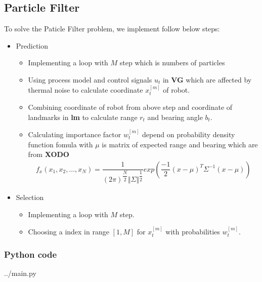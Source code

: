 \documentclass{article}
\begin{document}
\subsection{Particle Filter}
To solve the Paticle Filter problem, we implement follow below steps: \\
\begin{itemize}
	\item{Prediction} 
	\begin{itemize}
		\item{Implementing a loop with $M$ step which is numbers of particles}
		\item{Using process model and control signals $u_t$ in \textbf{VG} which are affected by thermal noise to calculate coordinate $x^{[m]}_t$ of robot.}
		\item{Combining coordinate of robot from above step and coordinate of landmarks in \textbf{lm} to calculate range $r_t$ and bearing angle $b_t$.}
		\item{Calculating importance factor $w^{[m]}_t$ depend on probability density function fomula with $\mu$ is matrix of expected range and bearing which are from \textbf{XODO}}
		\begin{align}
			f_x(x_1,x_2,...,x_N) = \dfrac{1}{\left(2\pi\right)^{\dfrac{N}{2}}\Vert\Sigma\Vert^{\dfrac{1}{2}}}exp\left(\dfrac{-1}{2}\left(x-\mu\right)^T\Sigma^{-1}\left(x-\mu\right)\right)
		\end{align}
	\end{itemize}
	\item{Selection}
	\begin{itemize}
		\item{Implementing a loop with $M$ step.}
		\item{Choosing a index in range $\left[1,M\right]$ for $x^{[m]}_t$ with probabilities $w^{[m]}_t$.}
	\end{itemize}
\end{itemize}
\subsubsection{Python code}

{../main.py}

\end{document}

